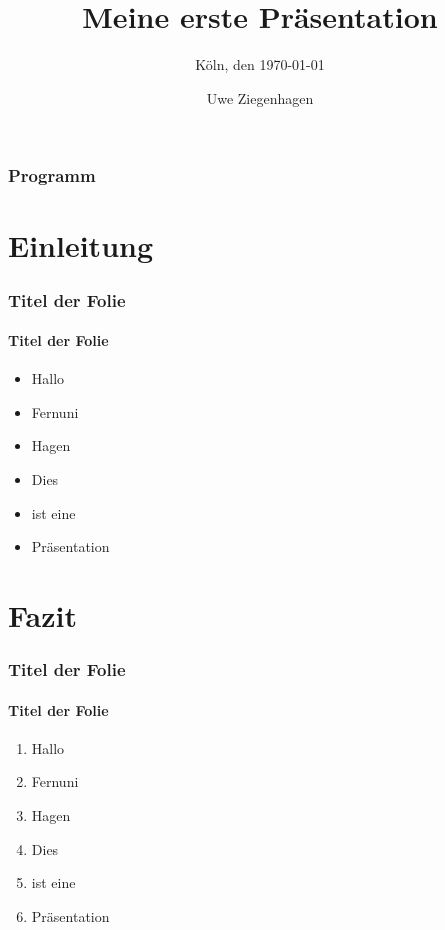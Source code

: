 \documentclass{beamer}
\author{Uwe Ziegenhagen}
\title{Meine erste Präsentation}
\subtitle{Köln, den \today}
\institute{Dante e.V.}
\begin{document}
\maketitle

\begin{frame}
\frametitle{Programm}

\tableofcontents

\end{frame}


\section{Einleitung}

\begin{frame}
\frametitle{Titel der Folie}
\framesubtitle{Titel der Folie}


\begin{itemize}
\item<1-> Hallo
\item<2-> Fernuni
\item<3-> Hagen
\item<4-> Dies 
\item<5-> ist eine
\item<6-> Präsentation
\end{itemize}
\end{frame}

\section{Fazit}

\begin{frame}
\frametitle{Titel der Folie}
\framesubtitle{Titel der Folie}

\begin{enumerate}
\item<2> Hallo
\item<1-> Fernuni
\item<-3> Hagen
\item<2> Dies 
\item<1,3> ist eine
\item Präsentation
\end{enumerate}
\end{frame}
\end{document}
